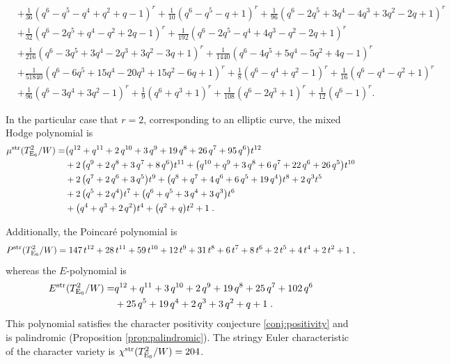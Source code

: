 \documentclass[11pt,english]{amsart}
\numberwithin{equation}{section}
\numberwithin{figure}{section}
\theoremstyle{plain}
\theoremstyle{plain}
\theoremstyle{definition}
\theoremstyle{remark}
\newcommand{\E}{\operatorname{E}}
\newcommand{\str}{\textup{str}}
\begin{document}
{\begin{align*}
& + \frac{1}{36}   {\left(q^{6} - q^{5} - q^{4} + q^{2} + q - 1\right)}^{r} + \frac{1}{10}   {\left(q^{6} - q^{5} - q + 1\right)}^{r} + \frac{1}{96}   {\left(q^{6} - 2  q^{5} + 3  q^{4} - 4  q^{3} + 3  q^{2} - 2  q + 1\right)}^{r} \\
& + \frac{1}{32}   {\left(q^{6} - 2  q^{5} + q^{4} - q^{2} + 2  q - 1\right)}^{r} + \frac{1}{192}   {\left(q^{6} - 2  q^{5} - q^{4} + 4  q^{3} - q^{2} - 2  q + 1\right)}^{r} \\
& + \frac{1}{216}   {\left(q^{6} - 3  q^{5} + 3  q^{4} - 2  q^{3} + 3  q^{2} - 3  q + 1\right)}^{r} + \frac{1}{1440}   {\left(q^{6} - 4  q^{5} + 5  q^{4} - 5  q^{2} + 4  q - 1\right)}^{r} \\
& + \frac{1}{51840}   {\left(q^{6} - 6  q^{5} + 15  q^{4} - 20  q^{3} + 15  q^{2} - 6  q + 1\right)}^{r} + \frac{1}{8}   {\left(q^{6} - q^{4} + q^{2} - 1\right)}^{r} + \frac{1}{16}   {\left(q^{6} - q^{4} - q^{2} + 1\right)}^{r} \\
& + \frac{1}{96}   {\left(q^{6} - 3  q^{4} + 3  q^{2} - 1\right)}^{r} + \frac{1}{9}   {\left(q^{6} + q^{3} + 1\right)}^{r} + \frac{1}{108}   {\left(q^{6} - 2  q^{3} + 1\right)}^{r} + \frac{1}{12}   {\left(q^{6} - 1\right)}^{r}.
\end{align*}
}

In the particular case that $r = 2$, corresponding to an elliptic curve, the mixed Hodge polynomial is
\begin{align*}
\mu^{\str}(T_{\E_6}^2/W) =& {\left(q^{12} + q^{11} + 2 \, q^{10} + 3 \, q^{9} + 19 \, q^{8} + 26 \, q^{7} + 95 \, q^{6}\right)} t^{12} \\
& + 2 \, {\left(q^{9} + 2 \, q^{8} + 3 \, q^{7} + 8 \, q^{6}\right)} t^{11} + {\left(q^{10} + q^{9} + 3 \, q^{8} + 6 \, q^{7} + 22 \, q^{6} + 26 \, q^{5}\right)} t^{10} \\
& + 2 \, {\left(q^{7} + 2 \, q^{6} + 3 \, q^{5}\right)} t^{9} + {\left(q^{8} + q^{7} + 4 \, q^{6} + 6 \, q^{5} + 19 \, q^{4}\right)} t^{8} + 2 \, q^{3} t^{5} \\
& + 2 \, {\left(q^{5} + 2 \, q^{4}\right)} t^{7} + {\left(q^{6} + q^{5} + 3 \, q^{4} + 3 \, q^{3}\right)} t^{6} \\
& + {\left(q^{4} + q^{3} + 2 \, q^{2}\right)} t^{4} + {\left(q^{2} + q\right)} t^{2} + 1\; .
\end{align*}

Additionally, the Poincar\'e polynomial is
\begin{align*}
    P^{\str}(T_{\E_6}^2/W) = 147 \, t^{12} + 28 \, t^{11} + 59 \, t^{10} + 12 \, t^{9} + 31 \, t^{8} + 6 \, t^{7} + 8 \, t^{6} + 2 \, t^{5} + 4 \, t^{4} + 2 \, t^{2} + 1\; ,
\end{align*}
whereas the $E$-polynomial is
\begin{align*}
E^{\str}(T_{\E_6}^2/W) =& q^{12} + q^{11} + 3 \, q^{10} + 2 \, q^{9} + 19 \, q^{8} + 25 \, q^{7} + 102 \, q^{6} \\
& + 25 \, q^{5} + 19 \, q^{4} + 2 \, q^{3} + 3 \, q^{2} + q + 1\; .
\end{align*}
This polynomial satisfies the character positivity conjecture \ref{conj:positivity} and is palindromic (Proposition \ref{prop:palindromic}). The stringy Euler characteristic of the character variety is $\chi^{\str}(T_{\E_6}^2/W)=204$.
\end{document}
